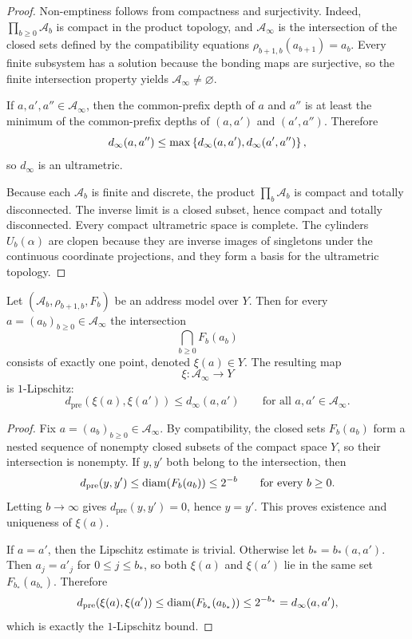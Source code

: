 \begin{proof}
Non-emptiness follows from compactness and surjectivity.  Indeed,
\(\prod_{b\geq 0}\mathcal{A}_b\) is compact in the product topology, and
\(\mathcal{A}_\infty\) is the intersection of the closed sets defined by
the compatibility equations \(\rho_{b+1,b}(a_{b+1})=a_b\).  Every
finite subsystem has a solution because the bonding maps are surjective,
so the finite intersection property yields
\(\mathcal{A}_\infty\neq\varnothing\).

If \(a,a',a''\in\mathcal{A}_\infty\), then the common-prefix depth of
\(a\) and \(a''\) is at least the minimum of the common-prefix depths of
\((a,a')\) and \((a',a'')\).  Therefore
\[
  d_\infty(a,a'')
  \leq \max\left\{d_\infty(a,a'),d_\infty(a',a'')\right\},
\]
so \(d_\infty\) is an ultrametric.

Because each \(\mathcal{A}_b\) is finite and discrete, the product
\(\prod_b\mathcal{A}_b\) is compact and totally disconnected.  The
inverse limit is a closed subset, hence compact and totally disconnected.
Every compact ultrametric space is complete.  The cylinders \(U_b(\alpha)\)
are clopen because they are inverse images of singletons under the
continuous coordinate projections, and they form a basis for the
ultrametric topology.
\end{proof}

\begin{theorem}
\label{thm:inverse-limit-determinacy}
Let \((\mathcal{A}_b,\rho_{b+1,b},F_b)\) be an address model over \(Y\).
Then for every \(a=(a_b)_{b\geq 0}\in\mathcal{A}_\infty\) the
intersection
\[
  \bigcap_{b\geq 0}F_b(a_b)
\]
consists of exactly one point, denoted \(\xi(a)\in Y\).  The resulting
map
\[
  \xi:\mathcal{A}_\infty\to Y
\]
is \(1\)-Lipschitz:
\[
  d_{\mathrm{pre}}(\xi(a),\xi(a'))
  \leq d_\infty(a,a')
  \qquad\text{for all } a,a'\in\mathcal{A}_\infty.
\]
\end{theorem}

\begin{proof}
Fix \(a=(a_b)_{b\geq 0}\in\mathcal{A}_\infty\).  By compatibility, the
closed sets \(F_b(a_b)\) form a nested sequence of nonempty closed
subsets of the compact space \(Y\), so their intersection is nonempty.
If \(y,y'\) both belong to the intersection, then
\[
  d_{\mathrm{pre}}(y,y')
  \leq \operatorname{diam}(F_b(a_b))
  \leq 2^{-b}
  \qquad\text{for every } b\geq 0.
\]
Letting \(b\to\infty\) gives \(d_{\mathrm{pre}}(y,y')=0\), hence
\(y=y'\).  This proves existence and uniqueness of \(\xi(a)\).

If \(a=a'\), then the Lipschitz estimate is trivial.  Otherwise let
\(b_\ast=b_\ast(a,a')\).  Then \(a_j=a'_j\) for \(0\leq j\leq b_\ast\),
so both \(\xi(a)\) and \(\xi(a')\) lie in the same set
\(F_{b_\ast}(a_{b_\ast})\).  Therefore
\[
  d_{\mathrm{pre}}(\xi(a),\xi(a'))
  \leq \operatorname{diam}(F_{b_\ast}(a_{b_\ast}))
  \leq 2^{-b_\ast}
  = d_\infty(a,a'),
\]
which is exactly the \(1\)-Lipschitz bound.
\end{proof}

